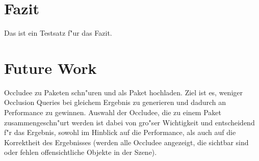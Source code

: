 \documentclass[journal]{vgtc}
\begin{document}
%
%
%
%

\section{Fazit}
Das ist ein Testsatz f"ur das Fazit.

\section{Future Work}
Occludee zu Paketen schn"uren und als Paket hochladen. Ziel ist es, weniger Occlusion Queries bei gleichem Ergebnis zu generieren und dadurch an Performance zu gewinnen.
Auswahl der Occludee, die zu einem Paket zusammengeschn"urt werden ist dabei von gro"ser Wichtigkeit und entscheidend f"r das Ergebnis, sowohl im Hinblick auf die Performance, als auch auf die Korrektheit des Ergebnisses (werden alle Occludee angezeigt, die sichtbar sind oder fehlen offensichtliche Objekte in der Szene).

 

\end{document}
